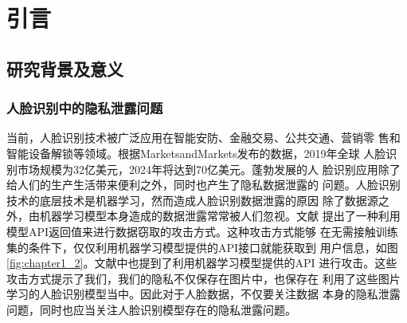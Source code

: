 
\chapter{引言}

\section{研究背景及意义}

\subsection{人脸识别中的隐私泄露问题}
当前，人脸识别技术被广泛应用在智能安防、金融交易、公共交通、营销零
售和智能设备解锁等领域。根据MarketsandMarkets发布的数据，2019年全球
人脸识别市场规模为32亿美元，2024年将达到70亿美元\cite{marketsmarkets2019}。蓬勃发展的人
脸识别应用除了给人们的生产生活带来便利之外，同时也产生了隐私数据泄露的
问题\cite{baiduwangxun2020,nandugeren2020,jiaziguangnian2020}。人脸识别技术的底层技术是机器学习，然而造成人脸识别数据泄露的原因
除了数据源之外，由机器学习模型本身造成的数据泄露常常被人们忽视。文献\cite{10.5555/3241094.3241142}
提出了一种利用模型API返回值来进行数据窃取的攻击方式。这种攻击方式能够
在无需接触训练集的条件下，仅仅利用机器学习模型提供的API接口就能获取到
用户信息，如图\ref{fig:chapter1_2}。文献\cite{10.5555/3241094.3241142,Fredrikson2015}中也提到了利用机器学习模型提供的API
进行攻击。这些攻击方式提示了我们，我们的隐私不仅保存在图片中，也保存在
利用了这些图片学习的人脸识别模型当中。因此对于人脸数据，不仅要关注数据
本身的隐私泄露问题，同时也应当关注人脸识别模型存在的隐私泄露问题。

